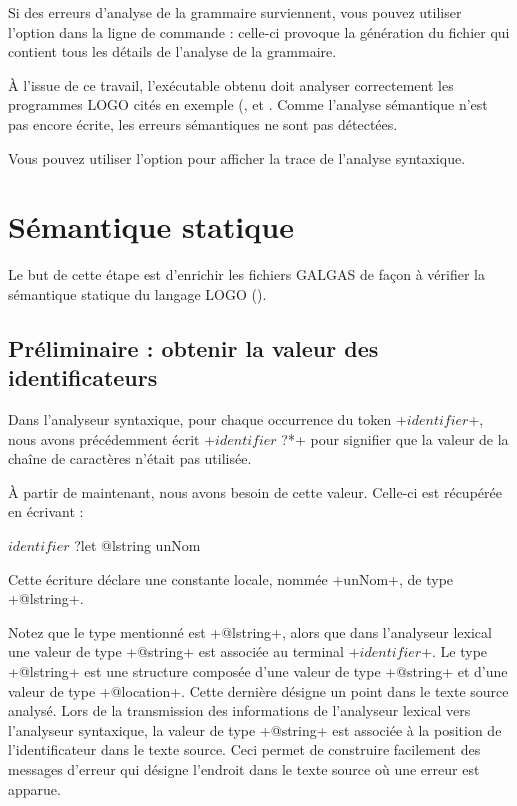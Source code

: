Si des erreurs d'analyse de la grammaire surviennent, vous pouvez utiliser l'option  dans la ligne de commande : celle-ci provoque la génération du fichier \- qui contient tous les détails de l'analyse de la grammaire.

À l'issue de ce travail, l'exécutable obtenu doit analyser correctement les programmes LOGO cités en exemple (,   et . Comme l'analyse sémantique n'est pas encore écrite, les erreurs sémantiques ne sont pas détectées.

Vous pouvez utiliser l'option  pour afficher la trace de l'analyse syntaxique.

\section{Sémantique statique}

Le but de cette étape est d'enrichir les fichiers GALGAS de façon à vérifier la sémantique statique du langage LOGO ().

\subsection{Préliminaire : obtenir la valeur des identificateurs}

Dans l’analyseur syntaxique, pour chaque occurrence du token \ggs+$identifier$+, nous avons précédemment écrit \ggs+$identifier$ ?*+ pour signifier que la valeur de la chaîne de caractères n’était pas utilisée.

À partir de maintenant, nous avons besoin de cette valeur. Celle-ci est récupérée en écrivant :

\begin{galgas}
$identifier$ ?let @lstring unNom
\end{galgas}


Cette écriture déclare une constante locale, nommée \ggs+unNom+, de type \ggs+@lstring+.

Notez que le type mentionné est \ggs+@lstring+, alors que dans l’analyseur lexical une valeur de type \ggs+@string+ est associée au terminal \ggs+$identifier$+. Le type \ggs+@lstring+ est une structure composée d’une valeur de type \ggs+@string+ et d’une valeur de type \ggs+@location+. Cette dernière désigne un point dans le texte source analysé. Lors de la transmission des informations de l’analyseur lexical vers l’analyseur syntaxique, la valeur de type \ggs+@string+ est associée à la position de l’identificateur dans le texte source. Ceci permet de construire facilement des messages d’erreur qui désigne l’endroit dans le texte source où une erreur est apparue.

